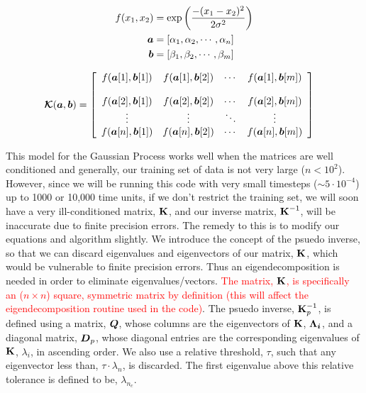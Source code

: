 \documentclass{article}
\begin{document}
\begin{minipage}{.35\textwidth}
\begin{align*}
    f(x_1, x_2) &= \exp\left(\frac{-(x_1 - x_2)^2}{2\sigma^2}\right)\\
    \boldsymbol{a} &= [\alpha_1, \alpha_2, \cdots, \alpha_n]\\
    \boldsymbol{b} &= [\beta_1, \beta_2, \cdots, \beta_m] 
\end{align*}
\end{minipage}
\begin{minipage}{.6\textwidth}
\begin{align*}
    \boldsymbol{\mathcal{K}}(\boldsymbol{a}, \boldsymbol{b})  &= \left[
    \begin{array}{c c c c}
        f(\boldsymbol{a}[1], \boldsymbol{b}[1]) &f(\boldsymbol{a}[1], \boldsymbol{b}[2]) &\cdots &f(\boldsymbol{a}[1], \boldsymbol{b}[m]) \\
        \\
        f(\boldsymbol{a}[2], \boldsymbol{b}[1]) &f(\boldsymbol{a}[2], \boldsymbol{b}[2]) &\cdots &f(\boldsymbol{a}[2], \boldsymbol{b}[m]) \\
        \vdots &\vdots &\ddots &\vdots \\
        f(\boldsymbol{a}[n], \boldsymbol{b}[1]) &f(\boldsymbol{a}[n], \boldsymbol{b}[2]) &\cdots &f(\boldsymbol{a}[n], \boldsymbol{b}[m])
    \end{array}\right]
\end{align*}

\end{minipage}

This model for the Gaussian Process works well when the matrices are well conditioned and generally, our training set of data is not very large ($n < 10^2$). However, since we will be running this code with very small timesteps ($\sim 5\cdot10^{-4}$) up to 1000 or 10,000 time units, if we don't restrict the training set, we will soon have a very ill-conditioned matrix, $\boldsymbol{\mathrm{K}}$, and our inverse matrix, $\boldsymbol{\mathrm{K}}^{-1}$, will be inaccurate due to finite precision errors. 
The remedy to this is to modify our equations and algorithm slightly. We introduce the concept of the psuedo inverse, so that we can discard eigenvalues and eigenvectors of our matrix, $\boldsymbol{\mathrm{K}}$, which would be vulnerable to finite precision errors. Thus an eigendecomposition is needed in order to eliminate eigenvalues/vectors. \textcolor{red}{The matrix, $\boldsymbol{\mathrm{K}}$, is specifically an ($n \times n$)  square, symmetric matrix by definition (this will affect the eigendecomposition routine used in the code)}. The psuedo inverse, $\boldsymbol{\mathrm{K}}_p^{-1}$, is defined using a matrix, $\boldsymbol{Q}$, whose columns are the eigenvectors of $\boldsymbol{\mathrm{K}}$, $\boldsymbol{\Lambda_i}$, and a diagonal matrix, $\boldsymbol{D}_p$, whose diagonal entries are the corresponding eigenvalues of $\boldsymbol{\mathrm{K}}$, $\lambda_i$, in ascending order. We also use a relative threshold, $\tau$, such that any eigenvector less than, $\tau \cdot \lambda_n$, is discarded. The first eigenvalue above this relative tolerance is defined to be, $\lambda_{n_c}$. 
\end{document}
